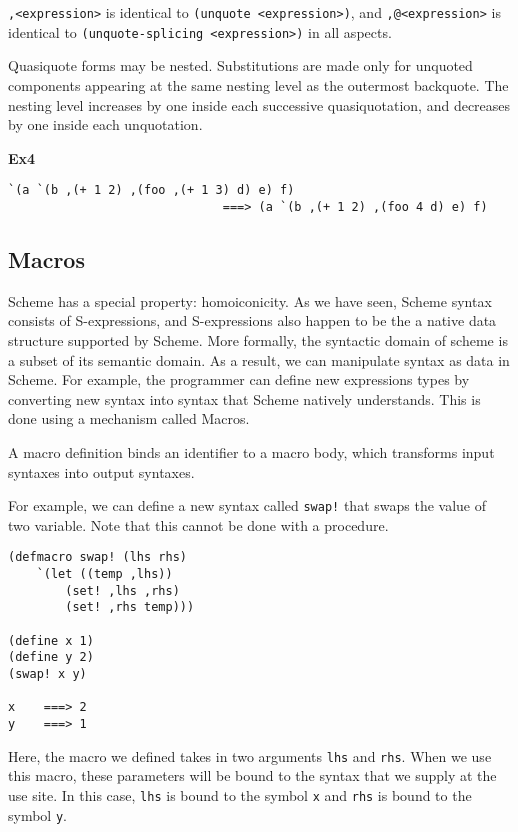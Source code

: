 \documentclass{article}
\begin{document}
\texttt{,<expression>} is identical to \texttt{(unquote <expression>)}, and \texttt{,@<expression>} is identical to \texttt{(unquote-splicing <expression>)} in all aspects.

Quasiquote forms may be nested. Substitutions are made only for unquoted components appearing at the same nesting level as the outermost backquote. The nesting level increases by one inside each successive quasiquotation, and decreases by one inside each unquotation.

\textbf{Ex4}
\begin{lstlisting}
`(a `(b ,(+ 1 2) ,(foo ,(+ 1 3) d) e) f)
                              ===> (a `(b ,(+ 1 2) ,(foo 4 d) e) f)
\end{lstlisting}

\subsection*{Macros}

Scheme has a special property: homoiconicity. As we have seen, Scheme syntax consists of S-expressions, and S-expressions also happen to be the a native data structure supported by Scheme. More formally, the syntactic domain of scheme is a subset of its semantic domain. As a result, we can manipulate syntax as data in Scheme. For example, the programmer can define new expressions types by converting new syntax into syntax that Scheme natively understands. This is done using a mechanism called Macros.

A macro definition binds an identifier to a macro body, which transforms input syntaxes into output syntaxes.

For example, we can define a new syntax called \texttt{swap!} that swaps the value of two variable. Note that this cannot be done with a procedure.

\begin{lstlisting}
(defmacro swap! (lhs rhs)
    `(let ((temp ,lhs))
        (set! ,lhs ,rhs)
        (set! ,rhs temp)))

(define x 1)
(define y 2)
(swap! x y)

x    ===> 2
y    ===> 1
\end{lstlisting}

Here, the macro we defined takes in two arguments \texttt{lhs} and \texttt{rhs}. When we use this macro, these parameters will be bound to the syntax that we supply at the use site. In this case, \texttt{lhs} is bound to the symbol \texttt{x} and \texttt{rhs} is bound to the symbol \texttt{y}.
\end{document}
